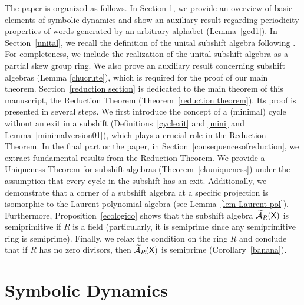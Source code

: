\documentclass[a4paper,12pt]{amsart}
\theoremstyle{definition}
\theoremstyle{remark}
\numberwithin{equation}{section}
\newcommand{\osf}{{\normalfont \textsf{X}}}
\newcommand{\ualgshift}{\TCA_R(\osf)}
\newcommand{\CA}{\mathcal{A}}
\newcommand{\TCA}{\widetilde{\CA}}
\begin{document}
The paper is organized as follows. In Section \ref{eleicoes}, we provide an overview of basic elements of symbolic dynamics and show an auxiliary result regarding periodicity properties of words generated by an arbitrary alphabet (Lemma~\ref{gcd1}). In Section~\ref{unital}, we recall the definition of the unital subshift algebra following \cite{BGGV}. For completeness, we include the realization of the unital subshift algebra as a partial skew group ring. We also prove an auxiliary result concerning subshift algebras (Lemma \ref{chucrute}), which is required for the proof of our main theorem. Section~\ref{reduction section} is dedicated to the main theorem of this manuscript, the Reduction Theorem (Theorem~\ref{reduction theorem}). Its proof is presented in several steps. We first introduce the concept of a (minimal) cycle without an exit in a subshift (Definitions~\ref{cyclexit} and \ref{mini} and Lemma~\ref{minimalversion01}), which plays a crucial role in the Reduction Theorem. In the final part or the paper, in Section~\ref{consequencesofreduction}, we extract fundamental results from the Reduction Theorem. We provide a Uniqueness Theorem for subshift algebras (Theorem~\ref{ckuniqueness}) under the assumption that every cycle in the subshift has an exit. Additionally, we demonstrate that a corner of a subshift algebra at a specific projection is isomorphic to the Laurent polynomial algebra (see Lemma~\ref{lem-Laurent-pol}). Furthermore, Proposition~\ref{ecologico} shows that the subshift algebra $\ualgshift$ is semiprimitive if $R$ is a field (particularly, it is semiprime since any semiprimitive ring is semiprime). Finally, we relax the condition on the ring $R$ and conclude that if $R$ has no zero divisors, then $\ualgshift$ is semiprime (Corollary~\ref{banana}).

\section{Symbolic Dynamics}\label{eleicoes}
\end{document}
